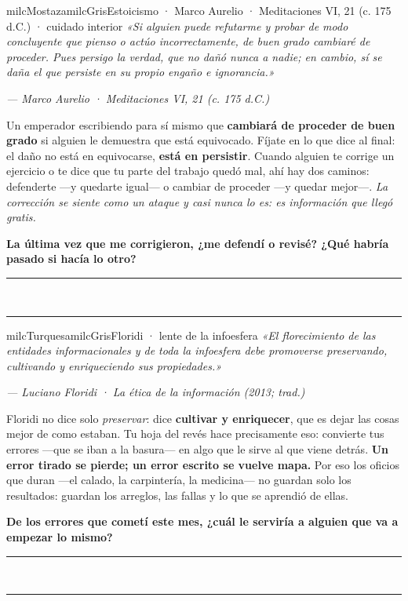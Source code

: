 \documentclass[11pt,letterpaper]{article}
\newcommand{\linead}[1]{\noindent\color{milcLinea}\rule{#1}{0.5pt}\color{milcNegro}}
\begin{document}
\begin{softbox}{milcMostaza}{milcGris}{Estoicismo · Marco Aurelio · Meditaciones VI, 21 (c. 175 d.C.) · cuidado interior}
\textit{«Si alguien puede refutarme y probar de modo concluyente que pienso o actúo incorrectamente, de buen grado cambiaré de proceder. Pues persigo la verdad, que no dañó nunca a nadie; en cambio, sí se daña el que persiste en su propio engaño e ignorancia.»}

{\footnotesize\itshape\color{milcNegro!70}--- Marco Aurelio · Meditaciones VI, 21 (c. 175 d.C.)}

Un emperador escribiendo para sí mismo que \textbf{cambiará de proceder de buen grado} si alguien le demuestra que está equivocado. Fíjate en lo que dice al final: el daño no está en equivocarse, \textbf{está en persistir}. Cuando alguien te corrige un ejercicio o te dice que tu parte del trabajo quedó mal, ahí hay dos caminos: defenderte ---y quedarte igual--- o cambiar de proceder ---y quedar mejor---. \emph{La corrección se siente como un ataque y casi nunca lo es: es información que llegó gratis.}

\textbf{La última vez que me corrigieron, ¿me defendí o revisé? ¿Qué habría pasado si hacía lo otro?}
\end{softbox}
\linead{\linewidth}\\[1mm]
\linead{\linewidth}

\begin{softbox}{milcTurquesa}{milcGris}{Floridi · lente de la infoesfera}
\textit{«El florecimiento de las entidades informacionales y de toda la infoesfera debe promoverse preservando, cultivando y enriqueciendo sus propiedades.»}

{\footnotesize\itshape\color{milcNegro!70}--- Luciano Floridi · La ética de la información (2013; trad.)}

Floridi no dice solo \emph{preservar}: dice \textbf{cultivar y enriquecer}, que es dejar las cosas mejor de como estaban. Tu hoja del revés hace precisamente eso: convierte tus errores ---que se iban a la basura--- en algo que le sirve al que viene detrás. \textbf{Un error tirado se pierde; un error escrito se vuelve mapa.} Por eso los oficios que duran ---el calado, la carpintería, la medicina--- no guardan solo los resultados: guardan los arreglos, las fallas y lo que se aprendió de ellas.

\textbf{De los errores que cometí este mes, ¿cuál le serviría a alguien que va a empezar lo mismo?}
\end{softbox}
\linead{\linewidth}\\[1mm]
\linead{\linewidth}
\end{document}
